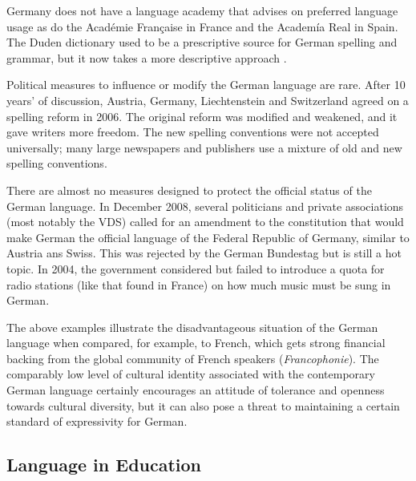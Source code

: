 \documentclass[]{../../metanetpaper}
\begin{document}
\begin{multicols}{2}
Germany does not have a language academy that advises on preferred language usage as do the Académie Française in France and the Academía Real in Spain. The Duden dictionary used to be a prescriptive source for German spelling and grammar, but it now takes a more descriptive approach \cite{Schn1}. 

Political measures to influence or modify the German language are rare. After 10 years’ of discussion, Austria, Germany, Liechtenstein and Switzerland agreed on a spelling reform in 2006. The original reform was modified and weakened, and it gave writers more freedom. The new spelling conventions were not accepted universally; many large newspapers and publishers use a mixture of old and new spelling conventions.


There are almost no measures designed to protect the official status of the German language. In December 2008, several politicians and private associations (most notably the VDS) called for an amendment to the constitution that would make German the official language of the Federal Republic of Germany, similar to Austria ans Swiss. This was rejected by the German Bundestag but is still a hot topic. In 2004, the government considered but failed to introduce a quota for radio stations (like that found in France) on how much music must be sung in German. 

The above examples illustrate the disadvantageous situation of the German language when compared, for example, to French, which gets strong financial backing from the global community of French speakers (\textit{Francophonie}). The comparably low level of cultural identity associated with the contemporary German language certainly encourages an attitude of tolerance and openness towards cultural diversity, but it can also pose a threat to maintaining a certain standard of expressivity for German.

\subsection{Language in Education}


\end{multicols}
\end{document}
